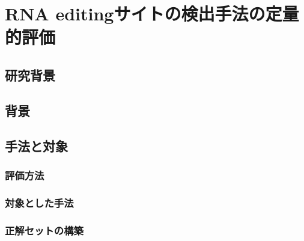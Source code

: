 \chapter{RNA editingサイトの検出手法の定量的評価}

\section{研究背景}

\section{背景}

\section{手法と対象}
\subsection{評価方法}
\subsection{対象とした手法}
\subsection{正解セットの構築}

